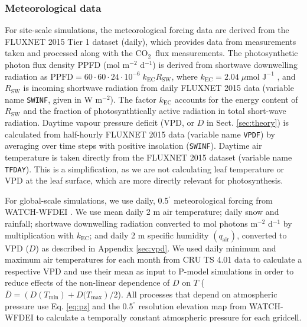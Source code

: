 \documentclass[gmd, manuscript]{copernicus}
\newcommand{\coo}{CO$_2$}
\begin{document}
\subsubsection{Meteorological data}
\label{sec:ppfd}
For site-scale simulations, the meteorological forcing data are derived from the FLUXNET 2015 Tier 1 dataset (daily), which provides data from measurements taken and processed along with the \coo\ flux measurements. The photosynthetic photon flux density PPFD (mol m$^{-2}$ d$^{-1}$) is derived from shortwave downwelling radiation as $\text{PPFD} = 60 \cdot 60 \cdot 24 \cdot 10^{-6} \; k_\text{EC} R_{\text{SW}}$, where $k_\text{EC} = 2.04\; \mu \text{mol J}^{-1}$ \citep{meek84}, and $R_{\text{SW}}$ is incoming shortwave radiation from daily FLUXNET 2015 data (variable name \texttt{SW\textunderscore IN\textunderscore F}, given in W m$^{-2}$). The factor $k_\text{EC}$ accounts for the energy content of $R_\text{SW}$ and the fraction of photosynthtically active radiation in total short-wave radiation. Daytime vapour pressure deficit (VPD, or $D$ in Sect. \ref{sec:theory}) is calculated from half-hourly FLUXNET 2015 data (variable name \texttt{VPD\textunderscore F}) by averaging over time steps with positive insolation (\texttt{SW\textunderscore IN\textunderscore F}). Daytime air temperature is taken directly from the FLUXNET 2015 dataset (variable name \texttt{T\textunderscore F\textunderscore DAY}). This is a simplification, as we are not calculating leaf temperature or VPD at the leaf surface, which are more directly relevant for photosynthesis. %

For global-scale simulations, we use daily, 0.5$^{^\circ}$ meteorological forcing from WATCH-WFDEI \citep{Weedon2014-nv}. We use mean daily 2 m air temperature; daily snow and rainfall; shortwave downwelling radiation converted to mol photons m$^{-2}$ d$^{-1}$ by multiplication with $k_\text{EC}$; and daily 2 m specific humidity $(q_\text{air})$, converted to VPD ($D$) as described in Appendix \ref{sec:vpd}. We used daily minimum and maximum air temperatures for each month from CRU TS 4.01 data \citep{harris14} to calculate a respective VPD and use their mean as input to P-model simulations in order to reduce effects of the non-linear dependence of $D$ on $T$ ($\overline{D} = \left( D(T_\text{min}) + D(T_\text{max} \right) / 2$). All processes that depend on atmospheric pressure use Eq. \ref{eq:pz} and the 0.5$^{^\circ}$ resolution elevation map from WATCH-WFDEI \citep{Weedon2014-nv} to calculate a temporally constant atmospheric pressure for each gridcell.
\end{document}
